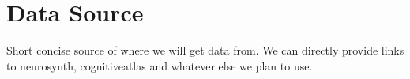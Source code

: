 \documentclass[11pt]{article}
\begin{document}
\section{Data Source}
Short concise source of where we will get data from. We can directly provide links to neurosynth, cognitiveatlas and whatever else we plan to use.

\small
%
%
\end{document}
